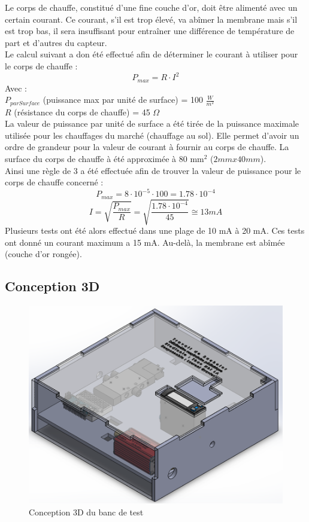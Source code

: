 Le corps de chauffe, constitué d'une fine couche d'or, doit être alimenté avec un certain courant. Ce courant, s'il est trop élevé, va abîmer la
membrane mais s'il est trop bas, il sera insuffisant pour entraîner une différence de température de part et d'autres du capteur. \\

Le calcul suivant a don été effectué afin de déterminer le courant à utiliser pour le corps de chauffe :
\[P_{max} = R\cdot I^2\]
Avec :\\
$P_{parSurface}$ (puissance max par unité de surface) = 100 $\frac{W}{m^2}$\\
$R$ (résistance du corps de chauffe) = 45 $\Omega$\\

La valeur de puissance par unité de surface a été tirée de la puissance maximale utilisée pour les chauffages du marché (chauffage au sol).
Elle permet d'avoir un ordre de grandeur pour la valeur de courant à fournir au corps de chauffe.
La surface du corps de chauffe à été approximée à 80 mm$^2$ ($2mm x 40mm$).\\
Ainsi une règle de 3 a été effectuée afin de trouver la valeur de puissance pour le corps de chauffe concerné :
\[P_{max} = 8\cdot 10^{-5}\cdot 100 = 1.78\cdot 10^{-4}\]
\[I = \sqrt{\frac{P_{max}}{R}} = \sqrt{\frac{1.78\cdot 10^{-4}}{45}} \cong 13 mA\]
Plusieurs tests ont été alors effectué dans une plage de 10 mA à 20 mA. Ces tests ont donné un courant maximum a 15 mA. Au-delà, la membrane
est abîmée (couche d'or rongée).\\

\subsection{Conception 3D}
\begin{figure}[H]
    \centering
    \includegraphics[scale = 0.5]{assets/figures/Banc_de_test.png}
    \caption{Conception 3D du banc de test}
    \label{fig:3D_banc_test}
\end{figure}

